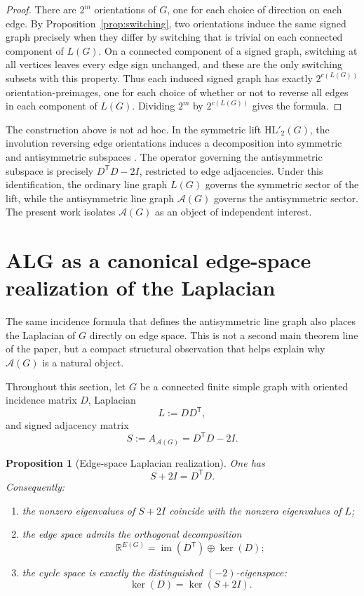 \documentclass[11pt]{article}
\newtheorem{proposition}{Proposition}
\theoremstyle{plain}
\begin{document}
\begin{proof}
There are $2^m$ orientations of $G$, one for each choice of direction on each
edge. By Proposition~\ref{prop:switching}, two orientations induce the same
signed graph precisely when they differ by switching that is trivial on each
connected component of $L(G)$. On a connected component of a signed graph,
switching at all vertices leaves every edge sign unchanged, and these are the
only switching subsets with this property. Thus each induced signed graph has
exactly $2^{c(L(G))}$ orientation-preimages, one for each choice of whether or
not to reverse all edges in each component of $L(G)$. Dividing $2^m$ by
$2^{c(L(G))}$ gives the formula.
\end{proof}
The construction above is not ad hoc. In the symmetric lift $\mathrm{HL}'_2(G)$, the involution reversing edge orientations induces a decomposition into symmetric and antisymmetric subspaces
\cite{BalHL}.
The operator governing the antisymmetric subspace is precisely $D^{\mathsf T}D - 2I$,
restricted to edge adjacencies. Under this identification, the ordinary line graph $L(G)$ governs the symmetric sector of the lift, while the antisymmetric line graph $\mathcal{A}(G)$ governs the antisymmetric sector. The present work isolates $\mathcal{A}(G)$ as an object of independent interest.


\section{ALG as a canonical edge-space realization of the Laplacian}
\label{sec:laplacian-geometry}

The same incidence formula that defines the antisymmetric line graph also places
the Laplacian of $G$ directly on edge space.
This is not a second main theorem line of the paper, but a compact structural
observation that helps explain why $\mathcal A(G)$ is a natural object.

Throughout this section, let $G$ be a connected finite simple graph with
oriented incidence matrix $D$, Laplacian
\[
L:=DD^{\mathsf T},
\]
and signed adjacency matrix
\[
S:=A_{\mathcal A(G)}=D^{\mathsf T}D-2I.
\]

\begin{proposition}[Edge-space Laplacian realization]
\label{prop:edge-space-laplacian}
One has
\[
S+2I=D^{\mathsf T}D.
\]
Consequently:
\begin{enumerate}
\item the nonzero eigenvalues of $S+2I$ coincide with the nonzero eigenvalues of
$L$;
\item the edge space admits the orthogonal decomposition
\[
\mathbb R^{E(G)}=\operatorname{im}(D^{\mathsf T})\oplus\ker(D);
\]
\item the cycle space is exactly the distinguished $(-2)$-eigenspace:
\[
\ker(D)=\ker(S+2I).
\]
\end{enumerate}
\end{proposition}
\end{document}

